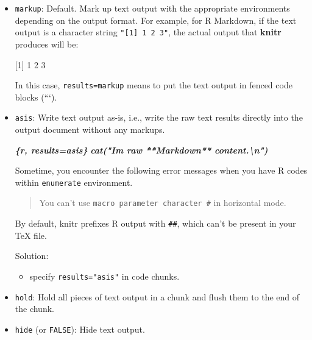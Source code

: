 \documentclass[
  a4paper,
  twoside,
  openright]{book}
\newenvironment{Shaded}{\begin{snugshade}}{\end{snugshade}}
\newcommand{\AttributeTok}[1]{\textcolor[rgb]{0.13,0.29,0.53}{#1}}
\newcommand{\InformationTok}[1]{\textcolor[rgb]{0.56,0.35,0.01}{\textbf{\textit{#1}}}}
\newcommand{\StringTok}[1]{\textcolor[rgb]{0.31,0.60,0.02}{#1}}
\providecommand{\tightlist}{%
  \setlength{\itemsep}{0pt}\setlength{\parskip}{0pt}}
\theoremstyle{definition}
\theoremstyle{definition}
\theoremstyle{definition}
\theoremstyle{definition}
\theoremstyle{remark}
\begin{document}
\begin{itemize}
\item
  \texttt{markup}: Default. Mark up text output with the appropriate environments depending on the output format. For example, for R Markdown, if the text output is a character string \texttt{"{[}1{]}\ 1\ 2\ 3"}, the actual output that \textbf{knitr} produces will be:

\begin{Shaded}
\begin{Highlighting}[]
\StringTok{\textasciigrave{}\textasciigrave{}\textasciigrave{}}
\AttributeTok{[1] 1 2 3}
\StringTok{\textasciigrave{}\textasciigrave{}\textasciigrave{}}
\end{Highlighting}
\end{Shaded}

  In this case, \texttt{results=\textquotesingle{}markup\textquotesingle{}} means to put the text output in fenced code blocks (```).
\item
  \texttt{asis}: Write text output as-is, i.e., write the raw text results directly into the output document without any markups.

\begin{Shaded}
\begin{Highlighting}[]
\InformationTok{\textasciigrave{}\textasciigrave{}\textasciigrave{}\{r, results=\textquotesingle{}asis\textquotesingle{}\}}
\InformationTok{cat("I\textquotesingle{}m raw **Markdown** content.\textbackslash{}n")}
\InformationTok{\textasciigrave{}\textasciigrave{}\textasciigrave{}}
\end{Highlighting}
\end{Shaded}

  Sometime, you encounter the following error messages when you have R codes within \texttt{enumerate} environment.

  \begin{quote}
  You can't use \texttt{macro\ parameter\ character\ \#} in horizontal mode.
  \end{quote}

  By default, knitr prefixes R output with \texttt{\#\#}, which can't be present in your TeX file.

  Solution:

  \begin{itemize}
  \tightlist
  \item
    specify \texttt{results="asis"} in code chunks.
  \end{itemize}
\item
  \texttt{hold}: Hold all pieces of text output in a chunk and flush them to the end of the chunk.
\item
  \texttt{hide} (or \texttt{FALSE}): Hide text output.
\end{itemize}
\end{document}
